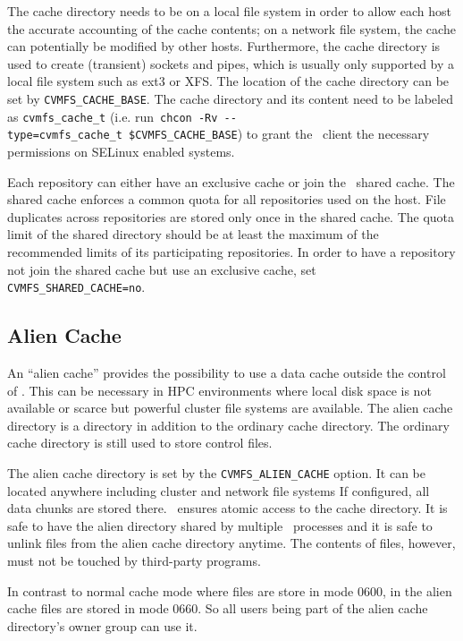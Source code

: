 The cache directory needs to be on a local file system in order to allow each host the accurate accounting of the cache contents; on a network file system, the cache can potentially be modified by other hosts.
Furthermore, the cache directory is used to create (transient) sockets and pipes, which is usually only supported by a local file system such as ext3 or XFS.
The location of the cache directory can be set by \texttt{CVMFS\_CACHE\_BASE}.
The cache directory and its content need to be labeled as \texttt{cvmfs\_cache\_t} (i.e. run~\texttt{chcon~-Rv~-{}-type=cvmfs\_cache\_t~\$CVMFS\_CACHE\_BASE}) to grant the \cvmfs\ client the necessary permissions on SELinux enabled systems.

Each repository can either have an exclusive cache or join the \cvmfs\ shared cache.
The shared cache enforces a common quota for all repositories used on the host.
File duplicates across repositories are stored only once in the shared cache.
The quota limit of the shared directory should be at least the maximum of the recommended limits of its participating repositories.
In order to have a repository not join the shared cache but use an exclusive cache, set \texttt{CVMFS\_SHARED\_CACHE=no}.

\subsection{Alien Cache}
An ``alien cache'' provides the possibility to use a data cache outside the control of \cvmfs.
This can be necessary in HPC environments where local disk space is not available or scarce but powerful cluster file systems are available.
The alien cache directory is a directory in addition to the ordinary cache directory.
The ordinary cache directory is still used to store control files.

The alien cache directory is set by the \texttt{CVMFS\_ALIEN\_CACHE} option.
It can be located anywhere including cluster and network file systems
If configured, all data chunks are stored there.
\cvmfs\ ensures atomic access to the cache directory.
It is safe to have the alien directory shared by multiple \cvmfs\ processes and it is safe to unlink files from the alien cache directory anytime.
The contents of files, however, must not be touched by third-party programs.

In contrast to normal cache mode where files are store in mode 0600, in the alien cache files are stored in mode 0660.  
So all users being part of the alien cache directory's owner group can use it.

